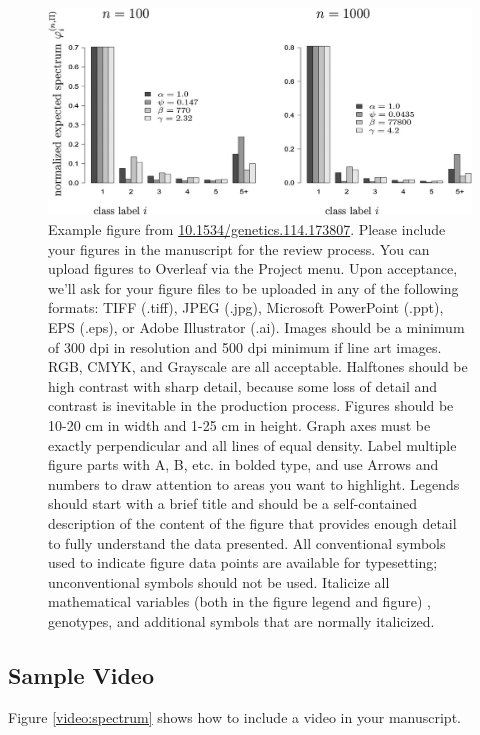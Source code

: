 \documentclass[9pt,twocolumn,twoside]{gsajnl}
\begin{document}
\begin{figure}[htbp]
\centering
\includegraphics[width=\linewidth]{example-figure}
\caption{Example figure from \url{10.1534/genetics.114.173807}. Please include your figures in the manuscript for the review process. You can upload figures to Overleaf via the Project menu. Upon acceptance, we'll ask for your figure files to be uploaded in any of the following formats: TIFF (.tiff), JPEG (.jpg), Microsoft PowerPoint (.ppt), EPS (.eps), or Adobe Illustrator (.ai).  Images should be a minimum of 300 dpi in resolution and 500 dpi minimum if line art images.  RGB, CMYK, and Grayscale are all acceptable. Halftones should be high contrast with sharp detail, because some loss of detail and contrast is inevitable in the production process. Figures should be 10-20 cm in width and 1-25 cm in height. Graph axes must be exactly perpendicular and all lines of equal density.
Label multiple figure parts with A, B, etc. in bolded type, and use Arrows and numbers to draw attention to areas you want to highlight. Legends should start with a brief title and should be a self-contained description of the content of the figure that provides enough detail to fully understand the data presented. All conventional symbols used to indicate figure data points are available for typesetting; unconventional symbols should not be used. Italicize all mathematical variables (both in the figure legend and figure) , genotypes, and additional symbols that are normally italicized.  
}%
\label{fig:spectrum}
\end{figure}

\subsection{Sample Video}

Figure \ref{video:spectrum} shows how to include a video in your manuscript.
\end{document}
